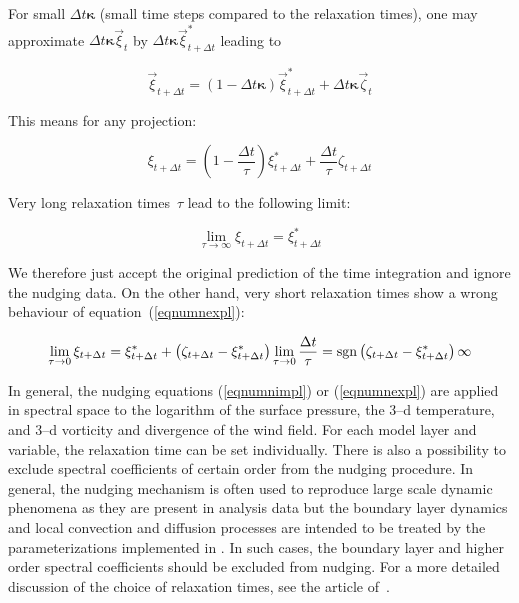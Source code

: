 \begin{appendix}
For small $\Delta t \boldsymbol{\kappa}$ (small time steps compared to
the relaxation times), one may approximate $\Delta t
\boldsymbol{\kappa}\vec{\xi}_t$ by $\Delta
t\boldsymbol{\kappa}\vec{\xi}^\ast_{t+\Delta t}$ leading to 

\begin{equation}
\vec{\xi}_{t+\Delta t}=(1-\Delta t
\boldsymbol{\kappa})\vec{\xi}^\ast_{t+\Delta t}+\Delta
t\boldsymbol{\kappa}\vec{\zeta}_t 
\end{equation}

This means for any projection:

\begin{equation}\label{eqnumnexpl}
\xi_{t+\Delta t}=\left(1-\frac{\Delta
    t}{\tau}\right)\xi^\ast_{t+\Delta t} + \frac{\Delta t}{\tau}\zeta_{t+\Delta t}
\end{equation}

Very long relaxation times~$\tau$ lead to the following
limit:

\begin{equation}\label{eqlimittauinfexpl}
\lim\limits_{\tau\rightarrow\infty}\xi_{t+\Delta t}=\xi^\ast_{t+\Delta t}
\end{equation}

We therefore just accept the original prediction of the time
integration and ignore the nudging data. On the other hand, very short
relaxation times show a wrong behaviour of
equation~(\ref{eqnumnexpl}):

\begin{equation}\label{eqlimittau0expl}
\lim\limits_{\tau\rightarrow 0}\xi_{t+\Delta t}=\xi^\ast_{t+\Delta
  t}+\left(\zeta_{t+\Delta t}-\xi^\ast_{t+\Delta
t}\right)\lim\limits_{\tau\rightarrow 0}\frac{\Delta
t}{\tau}={\rm sgn}\left(\zeta_{t+\Delta t}-\xi^\ast_{t+\Delta t}\right)\infty
\end{equation}

In general, the nudging equations (\ref{eqnumnimpl}) or
(\ref{eqnumnexpl}) are applied in spectral space to the logarithm of
the surface pressure, the 3--d temperature, and 3--d vorticity and
divergence of the wind field. For each model layer and variable, the
relaxation time can be set individually. There is also a possibility
to exclude spectral coefficients of certain order from the nudging
procedure. In general, the nudging mechanism is often used to reproduce
large scale dynamic phenomena as they are present in analysis data but
the boundary layer dynamics and 
local convection and diffusion processes are intended to be treated by
the parameterizations implemented in \echam. In such cases, the boundary
layer and higher order spectral coefficients should be excluded from
nudging. For a more detailed discussion of the choice of relaxation
times, see the article of~\cite{jeu969}.


\end{appendix}
